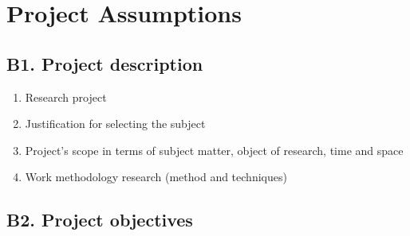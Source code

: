 \section*{Project Assumptions}\label{sec:project-assumptions}
\subsection*{B1. Project description}\label{subsec:project-description}
\begin{enumerate}
    \item Research project
    \item Justification for selecting the subject
    \item Project's scope in terms of subject matter, object of research, time and space
    \item Work methodology research (method and techniques)
\end{enumerate}
\subsection*{B2. Project objectives}\label{subsec:project-objectives}